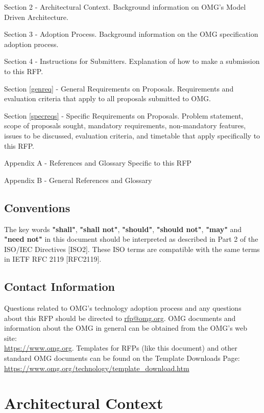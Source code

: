 Section 2 - Architectural Context. Background information on OMG's Model Driven Architecture. 

Section 3 - Adoption Process. Background information on the OMG specification adoption process.

Section 4 - Instructions for Submitters. Explanation of how to make a submission to this RFP.

Section \ref{genreq} - General Requirements on Proposals. Requirements and evaluation criteria that apply to all proposals submitted to OMG.

Section \ref{specreqs} - Specific Requirements on Proposals. Problem statement, scope of proposals sought, mandatory requirements, non-mandatory features, issues to be discussed, evaluation criteria, and timetable that apply specifically to this RFP. 

Appendix A - References and Glossary Specific to this RFP

Appendix B - General References and Glossary

\subsection{Conventions}

The key words \textbf{"shall"}, \textbf{"shall not"}, \textbf{"should"}, \textbf{"should not"}, \textbf{"may"} and \textbf{"need not"} in this document should be interpreted as described in Part 2 of the ISO/IEC Directives [ISO2]. These ISO terms are compatible with the same terms in IETF RFC 2119 [RFC2119].

\subsection{Contact Information}

Questions related to OMG's technology adoption process and any questions about this RFP should be directed to \href{mailto:rfp@omg.org}{rfp@omg.org}.
OMG documents and information about the OMG in general can be obtained from the OMG's web site:\\ \url{https://www.omg.org}. Templates for RFPs (like this document) and other standard OMG documents can be found on the Template Downloads Page:\\ \url{https://www.omg.org/technology/template\_download.htm}



\section{Architectural Context}

